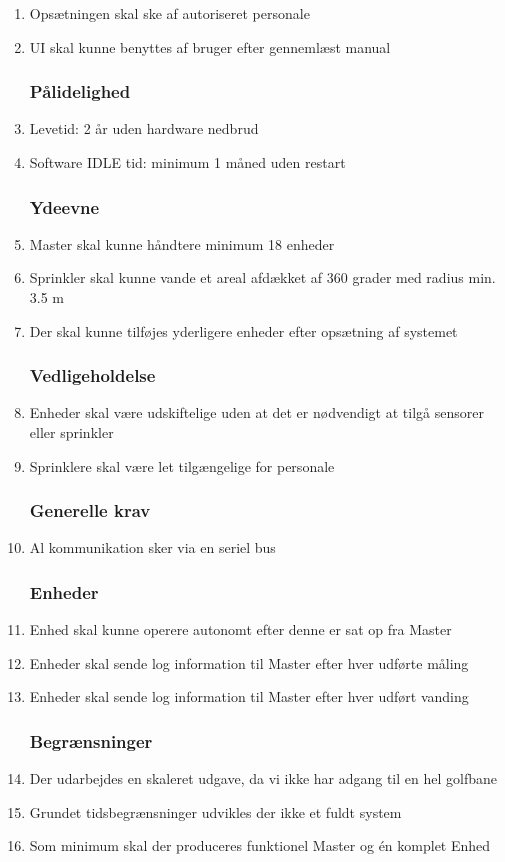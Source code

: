 \begin{enumerate}

\subsubsection*{Brugbarhed}
\item Opsætningen skal ske af autoriseret personale
\item UI skal kunne benyttes af bruger efter gennemlæst manual


\subsubsection*{Pålidelighed}
\item Levetid: 2 år uden hardware nedbrud
\item Software IDLE tid: minimum 1 måned uden restart


\subsubsection*{Ydeevne}
\item Master skal kunne håndtere minimum 18 enheder
\item Sprinkler skal kunne vande et areal afdækket af 360 grader med radius min. 3.5 m 
\item Der skal kunne tilføjes yderligere enheder efter opsætning af systemet


\subsubsection*{Vedligeholdelse}
\item Enheder skal være udskiftelige uden at det er nødvendigt at tilgå sensorer eller sprinkler
\item Sprinklere skal være let tilgængelige for personale


\subsubsection*{Generelle krav}
\item Al kommunikation sker via en seriel bus 


\subsubsection*{Enheder}
\item Enhed skal kunne operere autonomt efter denne er sat op fra Master
\item Enheder skal sende log information til Master efter hver udførte måling
\item Enheder skal sende log information til Master efter hver udført vanding


\subsubsection*{Begrænsninger}
\item Der udarbejdes en skaleret udgave, da vi ikke har adgang til en hel golfbane
\item Grundet tidsbegrænsninger udvikles der ikke et fuldt system 
\item Som minimum skal der produceres funktionel Master og én komplet Enhed
\end{enumerate}

